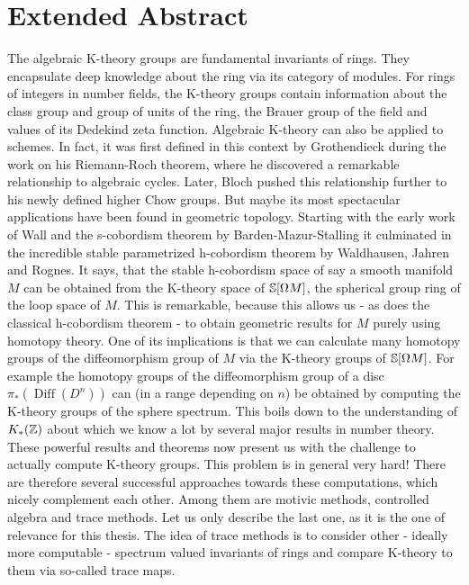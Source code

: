 \chapter*{Extended Abstract}

The algebraic K-theory groups are fundamental invariants of rings. 
They encapsulate deep knowledge about the ring via its category of modules.
For rings of integers in number fields, the K-theory groups contain information about the class group and group of units of the ring, the Brauer group of the field and values of its Dedekind zeta function.
Algebraic K-theory can also be applied to schemes. In fact, it was first defined in this context by Grothendieck during the work on his Riemann-Roch theorem, where he discovered a remarkable relationship to algebraic cycles.
Later, Bloch pushed this relationship further to his newly defined higher Chow groups.
But maybe its most spectacular applications have been found in geometric topology.
Starting with the early work of Wall and the s-cobordism theorem by Barden-Mazur-Stalling it culminated in the incredible stable parametrized h-cobordism theorem by Waldhausen, Jahren and Rognes. It says, that the stable h-cobordism space of say a smooth manifold $M$ can be obtained from the K-theory space of $\S[\Omega M]$, the spherical group ring of the loop space of $M$.
This is remarkable, because this allows us - as does the classical h-cobordism theorem - to obtain geometric results for $M$ purely using homotopy theory.
One of its implications is that we can calculate many homotopy groups of the diffeomorphism group of $M$ via the K-theory groups of $\S[\Omega M]$.
For example the homotopy groups of the diffeomorphism group of a disc $\pi_* (\operatorname{Diff}(D^n))$ can (in a range depending on $n$) be obtained by computing the K-theory groups of the sphere spectrum. This boils down to the understanding of $K_*(\Z)$ about which we know a lot by several major results in number theory.
\\
These powerful results and theorems now present us with the challenge to actually compute K-theory groups. 
This problem is in general very hard! 
There are therefore several successful approaches towards these computations, which nicely complement each other. Among them are motivic methods, controlled algebra and trace methods. 
Let us only describe the last one, as it is the one of relevance for this thesis.
The idea of trace methods is to consider other - ideally more computable - spectrum valued invariants of rings and compare K-theory to them via so-called trace maps. 
